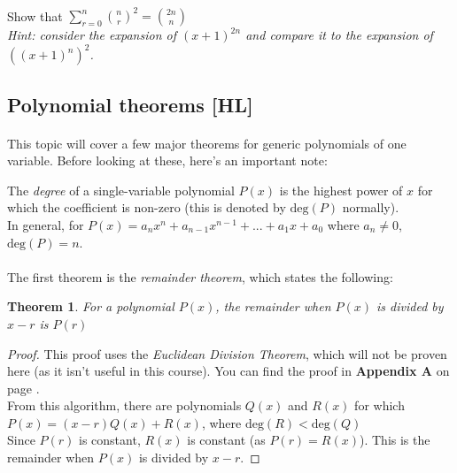 \documentclass[12pt, a4paper, titlepage, twoside]{article}
\newtheorem*{theorem*}{Theorem}
\begin{document}
	\paragraph{}
	 Show that $\displaystyle \sum_{r=0}^n {n \choose r}^2 = {{2n} \choose n}$\\ 
	
	\textit{Hint: consider the expansion of $(x+1)^{2n}$ and compare it to the expansion of $((x+1)^n)^2$.}
	
	
	\newpage
	
	\subsection{Polynomial theorems [HL]}
	
	\paragraph{}
	This topic will cover a few major theorems for generic polynomials of one variable. Before looking at these, here's an important
	note:\\
	
	\begin{kp}
		The \textit{degree} of a single-variable polynomial $P(x)$ is the highest power of $x$ for which the coefficient is non-zero
		(this is denoted by $\text{deg}(P)$ normally).\\
		
		In general, for $P(x) = a_n x^n + a_{n-1} x^{n-1} + ... + a_1 x + a_0$ where $a_n \neq 0$, $\text{deg}(P) = n$.
	\end{kp}
	
	\paragraph{}
	The first theorem is the \textit{remainder theorem}, which states the following:\\
	
	\begin{pf}
		\begin{theorem*}
			For a polynomial $P(x)$, the remainder when $P(x)$ is divided by $x-r$ is $P(r)$
		\end{theorem*}
		
		\tcbline
		
		\begin{proof}
			This proof uses the \textit{Euclidean Division Theorem}, which will not be proven here (as it isn't useful in this course).
			You can find the proof in \textbf{Appendix A} on page \pageref*{apA:euc-div}.\\
			
			From this algorithm, there are polynomials $Q(x)$ and $R(x)$ for which $P(x) = (x-r)Q(x) + R(x)$, where
			$\text{deg}(R) < \text{deg}(Q)$\\
			
			Since $P(r)$ is constant, $R(x)$ is constant (as $P(r) = R(x)$). This is the remainder when $P(x)$ is divided by $x-r$.
		\end{proof}
	\end{pf} 
	
\end{document}
